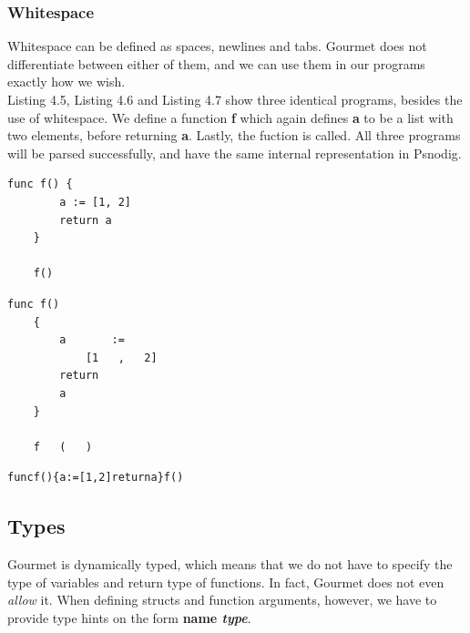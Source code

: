 \subsubsection{Whitespace}

Whitespace can be defined as spaces, newlines and tabs. Gourmet does not differentiate between either of them, and we can use them in our programs exactly how we wish. \hfill \\

Listing 4.5, Listing 4.6 and Listing 4.7 show three identical programs, besides the use of whitespace. We define a function \textbf{f} which again defines \textbf{a} to be a list with two elements, before returning \textbf{a}. Lastly, the fuction is called. All three programs will be parsed successfully, and have the same internal representation in Psnodig. \hfill \\

\begin{lstlisting}[caption={f with a standard amount of whitespace}, captionpos=b, frame=tlrb]
    func f() {
        a := [1, 2]
        return a
    }

    f()    
\end{lstlisting}

\begin{lstlisting}[caption={f with a lot of whitespace}, captionpos=b, frame=tlrb]
    func f()
    {
        a       :=
            [1   ,   2]
        return
        a
    }
    
    f   (   )
\end{lstlisting}

\begin{lstlisting}[caption={f with no whitespace}, captionpos=b, frame=tlrb]
    funcf(){a:=[1,2]returna}f()
\end{lstlisting}


\subsection{Types}

Gourmet is dynamically typed, which means that we do not have to specify the type of variables and return type of functions. In fact, Gourmet does not even \textit{allow} it. When defining structs and function arguments, however, we have to provide type hints on the form \textbf{name \textit{type}}. \hfill \\

